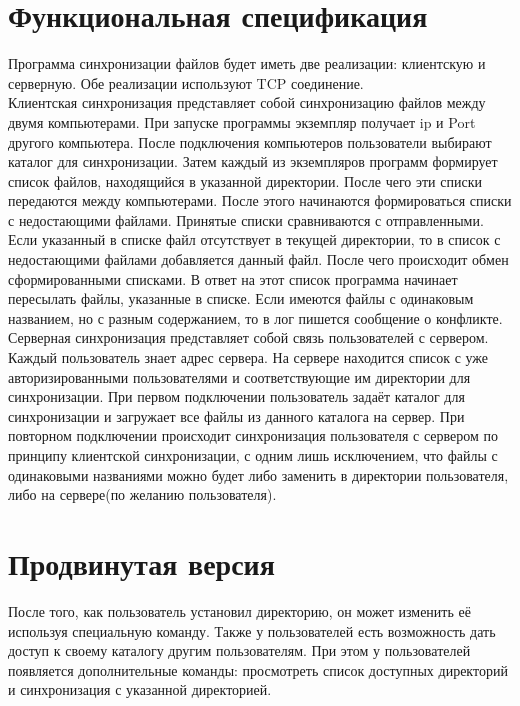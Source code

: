 \documentclass[a4paper,12pt]{report}
\begin{document}
\begin{frame}
	
	\section*{Функциональная спецификация}
Программа синхронизации файлов будет иметь две реализации: клиентскую и серверную. Обе реализации используют TCP соединение.\\
Клиентская синхронизация представляет собой синхронизацию файлов между двумя компьютерами. При запуске программы экземпляр получает ip и Port другого компьютера. После подключения компьютеров пользователи выбирают каталог для синхронизации. Затем каждый из экземпляров программ формирует список файлов, находящийся в указанной директории. После чего эти списки передаются между компьютерами. После этого начинаются формироваться списки с недостающими файлами. Принятые списки сравниваются с отправленными. Если указанный в списке файл отсутствует в текущей директории, то в список с недостающими файлами добавляется данный файл. После чего происходит обмен сформированными списками. В ответ на этот список программа начинает пересылать файлы, указанные в списке. Если имеются файлы с одинаковым названием, но с разным содержанием, то в лог пишется сообщение о конфликте.\\
Серверная синхронизация представляет собой связь пользователей с сервером. Каждый пользователь знает адрес сервера. На сервере находится список с уже авторизированными пользователями и соответствующие им директории для синхронизации. При первом подключении пользователь задаёт каталог для синхронизации и загружает все файлы из данного каталога на сервер. При повторном подключении происходит синхронизация пользователя с сервером по принципу клиентской синхронизации, с одним лишь исключением, что файлы с одинаковыми названиями можно будет либо заменить в директории пользователя, либо на сервере(по желанию пользователя).
	\section*{Продвинутая версия}
После того, как пользователь установил директорию, он может изменить её используя специальную команду. Также у пользователей есть возможность дать доступ к своему каталогу другим пользователям. При этом у пользователей появляется дополнительные команды: просмотреть список доступных директорий и синхронизация с указанной директорией.

\end{frame}

	

\end{document}
